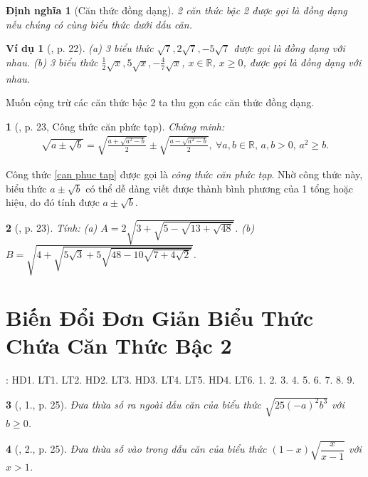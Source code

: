 \documentclass{article}
\newtheorem{baitoan}{}%
\newtheorem{dinhnghia}{Định nghĩa}
\newtheorem{vidu}{Ví dụ}
\begin{document}
\begin{dinhnghia}[Căn thức đồng dạng]
	2 căn thức bậc 2 được gọi là {\rm đồng dạng} nếu chúng có cùng biểu thức dưới dấu căn.
\end{dinhnghia}

\begin{vidu}[\cite{Binh_boi_duong_Toan_9_tap_1}, p. 22]
	(a) 3 biểu thức $\sqrt{7},2\sqrt{7},-5\sqrt{7}$ được gọi là {\rm đồng dạng} với nhau. (b) 3 biểu thức $\frac{1}{2}\sqrt{x},5\sqrt{x},-\frac{4}{7}\sqrt{x}$, $x\in\mathbb{R}$, $x\ge0$, được gọi là {\rm đồng dạng} với nhau.
\end{vidu}
Muốn cộng trừ các căn thức bậc 2 ta thu gọn các căn thức đồng dạng.

\begin{baitoan}[\cite{Binh_boi_duong_Toan_9_tap_1}, p. 23, Công thức căn phức tạp]
	Chứng minh:
	\begin{align}
		\label{can phuc tap}
		\sqrt{a\pm\sqrt{b}} = \sqrt{\frac{a + \sqrt{a^2 - b}}{2}}\pm\sqrt{\frac{a - \sqrt{a^2 - b}}{2}},\ \forall a,b\in\mathbb{R},\,a,b > 0,\,a^2\ge b.
	\end{align}
\end{baitoan}
Công thức \eqref{can phuc tap} được gọi là \textit{công thức căn phức tạp}. Nhờ công thức này, biểu thức $a\pm\sqrt{b}$ có thể dễ dàng viết được thành bình phương của 1 tổng hoặc hiệu, do đó tính được $a\pm\sqrt{b}$.

\begin{baitoan}[\cite{Binh_boi_duong_Toan_9_tap_1}, p. 23]
	Tính: (a) $A = 2\sqrt{3 + \sqrt{5 - \sqrt{13 + \sqrt{48}}}}$. (b) $B = \sqrt{4 + \sqrt{5\sqrt{3} + 5\sqrt{48 - 10\sqrt{7 + 4\sqrt{2}}}}}$.
\end{baitoan}


\section{Biến Đổi Đơn Giản Biểu Thức Chứa Căn Thức Bậc 2}
\cite[Chap. III, \S3, pp. 61--71]{SGK_Toan_9_Canh_Dieu_tap_1}: HD1. LT1. LT2. HD2. LT3. HD3. LT4. LT5. HD4. LT6. 1. 2. 3. 4. 5. 6. 7. 8. 9.

\begin{baitoan}[\cite{Binh_boi_duong_Toan_9_tap_1}, 1., p. 25]
	Đưa thừa số ra ngoài dấu căn của biểu thức $\sqrt{25(-a)^2b^3}$ với $b\ge0$.
\end{baitoan}

\begin{baitoan}[\cite{Binh_boi_duong_Toan_9_tap_1}, 2., p. 25]
	Đưa thừa số vào trong dấu căn của biểu thức $(1 - x)\sqrt{\dfrac{x}{x - 1}}$ với $x > 1$.
\end{baitoan}
\end{document}
